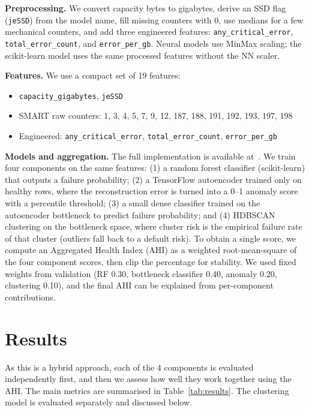\documentclass[sigconf,natbib=false]{acmart}
\begin{document}
\textbf{Preprocessing.} We convert capacity bytes to gigabytes, derive an SSD flag (\texttt{jeSSD}) from the model name, fill missing counters with 0, use medians for a few mechanical counters, and add three engineered features: \texttt{any\_critical\_error}, \texttt{total\_error\_count}, and \texttt{error\_per\_gb}. Neural models use MinMax scaling; the scikit-learn model uses the same processed features without the NN scaler.

\textbf{Features.} We use a compact set of 19 features:
\begin{itemize}
  \item \texttt{capacity\_gigabytes}, \texttt{jeSSD}
  \item SMART raw counters: 1, 3, 4, 5, 7, 9, 12, 187, 188, 191, 192, 193, 197, 198
  \item Engineered: \texttt{any\_critical\_error}, \texttt{total\_error\_count}, \texttt{error\_per\_gb}
\end{itemize}

\textbf{Models and aggregation.} The full implementation is available at~\cite{petek2026github}. We train four components on the same features: (1) a random forest classifier (scikit-learn) that outputs a failure probability; (2) a TensorFlow autoencoder trained only on healthy rows, where the reconstruction error is turned into a 0--1 anomaly score with a percentile threshold; (3) a small dense classifier trained on the autoencoder bottleneck to predict failure probability; and (4) HDBSCAN clustering on the bottleneck space, where cluster risk is the empirical failure rate of that cluster (outliers fall back to a default risk). To obtain a single score, we compute an Aggregated Health Index (AHI) as a weighted root-mean-square of the four component scores, then clip the percentage for stability. We used fixed weights from validation (RF 0.30, bottleneck classifier 0.40, anomaly 0.20, clustering 0.10), and the final AHI can be explained from per-component contributions.

\section{Results}
\label{sec:results}

As this is a hybrid approach, each of the 4 components is evaluated independently first, and then we assess how well they work together using the AHI. The main metrics are summarised in Table~\ref{tab:results}. The clustering model is evaluated separately and discussed below.
\end{document}
